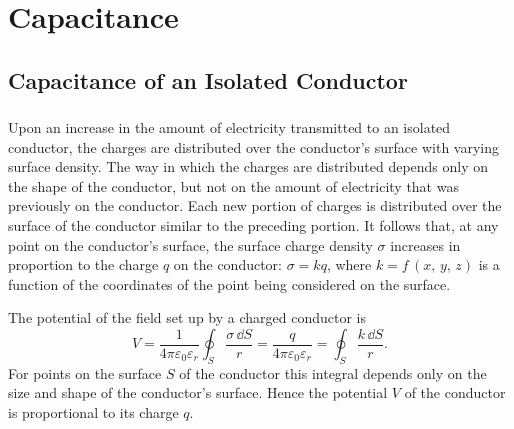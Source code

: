





\chapter{Capacitance}
\label{ch-17}

\section{Capacitance of an Isolated Conductor}
\label{sec-17.1}

\subsection{}\label{17.1.1} Upon an increase in the amount of electricity transmitted to an isolated conductor, the charges are distributed over the conductor's surface with varying surface density. The way in which the charges are distributed depends only on the shape of the conductor, but not on the amount of electricity that was previously on the conductor. Each new portion of charges is distributed over the surface of the conductor similar to the preceding portion. It follows that, at any point on the conductor's surface, the surface charge density $\sigma$  increases in proportion to the charge $q$ on the conductor: $\sigma = kq$, where $k = f \,(x, \,y,\, z)$ is a function of the coordinates of the point being considered on the surface.

The potential of the field set up by a charged conductor  is
\begin{equation*}%
V =\frac{1}{4 \pi \varepsilon_{0}\varepsilon_{r}} \oint_{S} \frac{\sigma \, \dd S}{r} = \frac{q}{4 \pi \varepsilon_{0}\varepsilon_{r}} =  \oint_{S} \frac{k \, \dd S}{r}.
\end{equation*}
For points on the surface $S$ of the conductor this integral depends only on the size and shape of the conductor's surface. Hence the potential $V$ of the conductor is proportional to its charge $q$.

